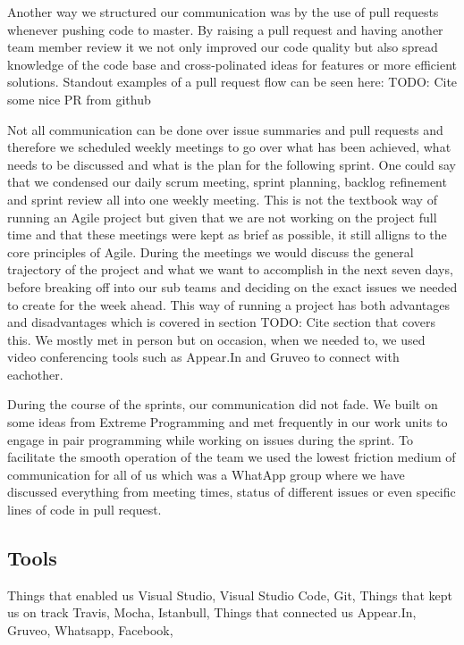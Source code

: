 \documentclass[a4paper]{article}
\begin{document}
	Another way we structured our communication was by the use of pull requests whenever pushing code to master. By raising a pull request and having another team member review it we not only improved our code quality but also spread knowledge of the code base and cross-polinated ideas for features or more efficient solutions. Standout examples of a pull request flow can be seen here: TODO: Cite some nice PR from github
	
	Not all communication can be done over issue summaries and pull requests and therefore we scheduled weekly meetings to go over what has been achieved, what needs to be discussed and what is the plan for the following sprint. One could say that we condensed our daily scrum meeting, sprint planning, backlog refinement and sprint review all into one weekly meeting. This is not the textbook way of running an Agile project but given that we are not working on the project full time and that these meetings were kept as brief as possible, it still alligns to the core principles of Agile. During the meetings we would discuss the general trajectory of the project and what we want to accomplish in the next seven days, before breaking off into our sub teams and deciding on the exact issues we needed to create for the week ahead. This way of running a project has both advantages and disadvantages which is covered in section TODO: Cite section that covers this. We mostly met in person but on occasion, when we needed to, we used video conferencing tools such as Appear.In and Gruveo to connect with eachother.
	
	During the course of the sprints, our communication did not fade. We built on some ideas from Extreme Programming and met frequently in our work units to engage in pair programming while working on issues during the sprint. To facilitate the smooth operation of the team we used the lowest friction medium of communication for all of us which was a WhatApp group where we have discussed everything from meeting times, status of different issues or even specific lines of code in pull request. 
	
	\subsection{Tools}
	
	Things that enabled us
	Visual Studio, Visual Studio Code, Git,
	Things that kept us on track
	Travis, Mocha, Istanbull,
	Things that connected us
	Appear.In, Gruveo, Whatsapp, Facebook,
	
\end{document}
